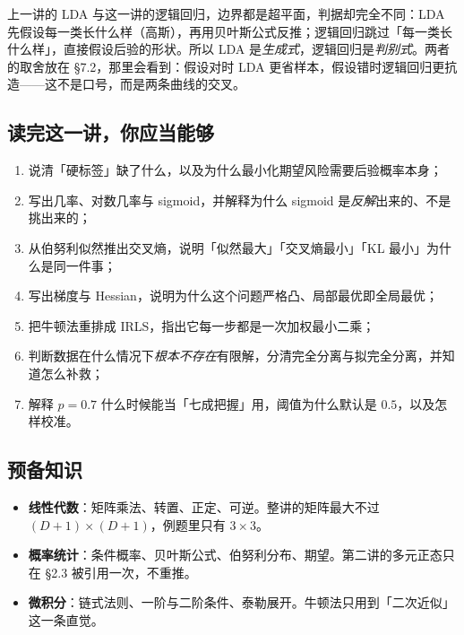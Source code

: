 \documentclass[11pt,a4paper,fontset=windows,zihao=-4]{ctexart}
\begin{document}
\begin{add}[它与上一讲的关系]
上一讲的 LDA 与这一讲的逻辑回归，边界都是超平面，判据却完全不同：LDA 先假设每一类长什么样（高斯），再用贝叶斯公式反推；逻辑回归跳过「每一类长什么样」，直接假设后验的形状。所以 LDA 是\emph{生成式}，逻辑回归是\emph{判别式}。两者的取舍放在 \S7.2，那里会看到：假设对时 LDA 更省样本，假设错时逻辑回归更抗造——这不是口号，而是两条曲线的交叉。
\end{add}

\subsection*{读完这一讲，你应当能够}

\begin{enumerate}[label=\textcolor{navy}{\bfseries\arabic*.},leftmargin=2.2em]
  \item 说清「硬标签」缺了什么，以及为什么最小化期望风险需要后验概率本身；
  \item 写出几率、对数几率与 sigmoid，并解释为什么 sigmoid 是\emph{反解}出来的、不是挑出来的；
  \item 从伯努利似然推出交叉熵，说明「似然最大」「交叉熵最小」「KL 最小」为什么是同一件事；
  \item 写出梯度与 Hessian，说明为什么这个问题严格凸、局部最优即全局最优；
  \item 把牛顿法重排成 IRLS，指出它每一步都是一次加权最小二乘；
  \item 判断数据在什么情况下\emph{根本不存在}有限解，分清完全分离与拟完全分离，并知道怎么补救；
  \item 解释 $p=0.7$ 什么时候能当「七成把握」用，阈值为什么默认是 $0.5$，以及怎样校准。
\end{enumerate}

\subsection*{预备知识}

\begin{itemize}
  \item \textbf{线性代数}：矩阵乘法、转置、正定、可逆。整讲的矩阵最大不过 $(D+1)\times(D+1)$，例题里只有 $3\times3$。
  \item \textbf{概率统计}：条件概率、贝叶斯公式、伯努利分布、期望。第二讲的多元正态只在 \S2.3 被引用一次，不重推。
  \item \textbf{微积分}：链式法则、一阶与二阶条件、泰勒展开。牛顿法只用到「二次近似」这一条直觉。
\end{itemize}
\end{document}
